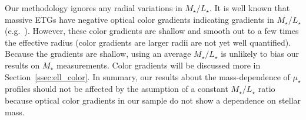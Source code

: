 \documentclass[a4paper,fleqn,usenatbib]{mnras}
\def\etal{{\ et al.~}}
\def\ser{{S\'{e}rsic\ }}
\def\mstar{{$M_{\star}$}}
\def\m2l{{$M_{\star}/L_{\star}$}}
\def\mden{{$\mu_{\star}$}}
\begin{document}
    Our methodology ignores any radial variations in \m2l{}. 
    It is well known that massive ETGs have negative optical color gradients 
    indicating gradients in \m2l{} (e.g.\ \citealt{Carollo1993, Davies1993, 
    LaBarbera2012, DSouza2015}). However, these color gradients are shallow and smooth out to a few times the effective 
    radius (color gradients are larger radii are not yet well quantified). Because the gradients are shallow, using an average \m2l{} is unlikely to bias our results on \mstar{}
    measurements. Color gradients will be discussed more in Section~\ref{ssec:ell_color}. 
    In summary, our results about the mass-dependence of \mden{} profiles should not be affected by the asumption of a constant  \m2l{} ratio because optical color gradients in our sample do not show a dependence on  stellar mass.
    

    
    
    
        
   
\end{document}
